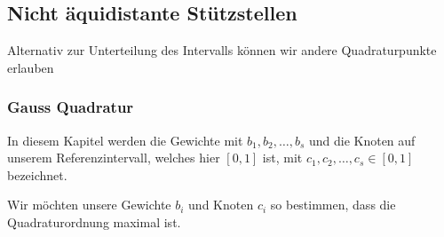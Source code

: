 \newsection
\subsection{Nicht äquidistante Stützstellen}
Alternativ zur Unterteilung des Intervalls können wir andere Quadraturpunkte erlauben

\subsubsection{Gauss Quadratur}
In diesem Kapitel werden die Gewichte mit $b_1, b_2, \ldots, b_s$ und die Knoten auf unserem Referenzintervall,
welches hier $[0, 1]$ ist, mit $c_1, c_2, \ldots, c_s \in [0, 1]$ bezeichnet.

Wir möchten unsere Gewichte $b_i$ und Knoten $c_i$ so bestimmen, dass die Quadraturordnung maximal ist.
